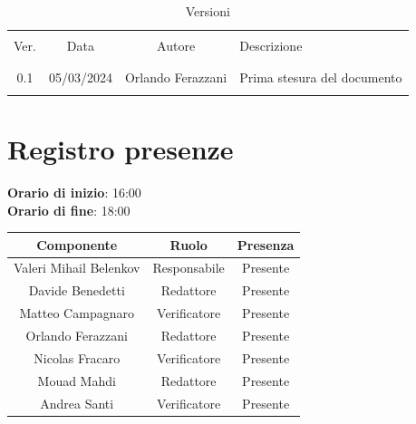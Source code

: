 \documentclass[italian, 12pt]{article}
\begin{document}
\pagestyle{mystyle}


\begin{table}[!h]
	\caption{Versioni}
	\begin{center}
		\begin{tabular}{ c c c p{9cm}}
			\hline \\[-2ex]
			Ver. & Data & Autore & Descrizione \\
			\\[-2ex] \hline \\[-1.5ex]
			0.1 & 05/03/2024 & Orlando Ferazzani& Prima stesura del documento\\
			\\[-1.5ex] \hline
		\end{tabular}
	\end{center}
\end{table}


\tableofcontents
\newpage


\section{Registro presenze}

\textbf{Orario di inizio}: 16:00\\
\textbf{Orario di fine}: 18:00\\


\begin{flushleft}
	\begin{table}[!h]
	\begin{tabular}{ |c|c|c| } 
		\hline
		\textbf{Componente} & \textbf{Ruolo} & \textbf{Presenza} \\
  \hline 
		Valeri Mihail Belenkov & Responsabile & Presente \\ 
		Davide Benedetti 	& Redattore & Presente \\
		Matteo Campagnaro	& Verificatore & Presente \\
		Orlando Ferazzani 	& Redattore & Presente \\
		Nicolas Fracaro 	& Verificatore & Presente \\
		Mouad Mahdi		    & Redattore & Presente \\ 
		Andrea Santi 	    & Verificatore & Presente \\
		\hline
	\end{tabular}
	\end{table}
	\end{flushleft}
\end{document}
